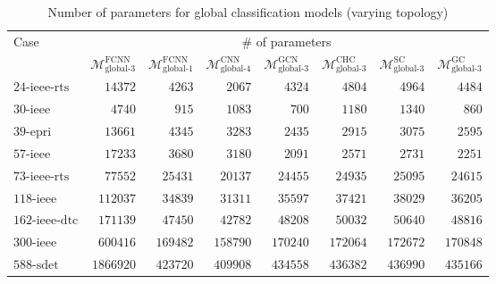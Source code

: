\documentclass[journal]{IEEEtran}
\begin{document}
\begin{table*}[!ht]
\small
\caption{Number of parameters for global classification models (varying topology)}
\label{tab:params_clf_global_contingency}
\def\na{---}
\centering
    \begin{tabular}{lr|rrrrrr}
    \toprule
    \multirow{2}{*}{Case} & \multicolumn{7}{c}{\# of parameters} \\ 
    \cmidrule(r){2-8}
    & $\mathcal{M}^{\textrm{FCNN}}_{\textrm{global-3}}$ & $\mathcal{M}^{\textrm{FCNN}}_{\textrm{global-1}}$ & $\mathcal{M}^{\textrm{CNN}}_{\textrm{global-4}}$ & $\mathcal{M}^{\textrm{GCN}}_{\textrm{global-3}}$ & $\mathcal{M}^{\textrm{CHC}}_{\textrm{global-3}}$ & $\mathcal{M}^{\textrm{SC}}_{\textrm{global-3}}$ & $\mathcal{M}^{\textrm{GC}}_{\textrm{global-3}}$ \\
    \midrule
    $\textrm{24-ieee-rts}$ & $14372$ & $4263$ & $2067$ & $4324$ & $4804$ & $4964$ & $4484$ \\
    $\textrm{30-ieee}$ & $4740$ & $915$ & $1083$ & $700$ & $1180$ & $1340$ & $860$ \\
    $\textrm{39-epri}$ & $13661$ & $4345$ & $3283$ & $2435$ & $2915$ & $3075$ & $2595$ \\
    $\textrm{57-ieee}$ & $17233$ & $3680$ & $3180$ & $2091$ & $2571$ & $2731$ & $2251$ \\
    $\textrm{73-ieee-rts}$ & $77552$ & $25431$ & $20137$ & $24455$ & $24935$ & $25095$ & $24615$ \\
    $\textrm{118-ieee}$ & $112037$ & $34839$ & $31311$ & $35597$ & $37421$ & $38029$ & $36205$ \\
    $\textrm{162-ieee-dtc}$ & $171139$ & $47450$ & $42782$ & $48208$ & $50032$ & $50640$ & $48816$ \\
    $\textrm{300-ieee}$ & $600416$ & $169482$ & $158790$ & $170240$ & $172064$ & $172672$ & $170848$ \\
    $\textrm{588-sdet}$ & $1866920$ & $423720$ & $409908$ & $434558$ & $436382$ & $436990$ & $435166$ \\
    \bottomrule
    \end{tabular}
\end{table*}

\ifCLASSOPTIONcaptionsoff
  \newpage
\fi
\end{document}
